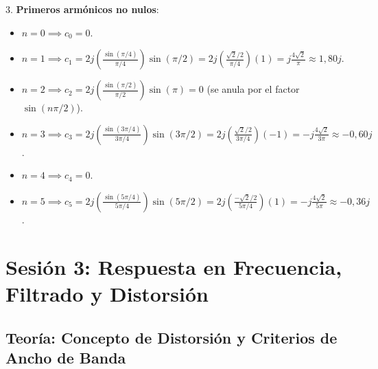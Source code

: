 \begin{resolucion}
3. \textbf{Primeros armónicos no nulos}:
   \begin{itemize}
       \item $n = 0 \implies c_0 = 0$.
       \item $n = 1 \implies c_1 = 2j \left(\frac{\sin(\pi/4)}{\pi/4}\right) \sin(\pi/2) = 2j \left(\frac{\sqrt{2}/2}{\pi/4}\right) (1) = j \frac{4\sqrt{2}}{\pi} \approx 1{,}80j$.
       \item $n = 2 \implies c_2 = 2j \left(\frac{\sin(\pi/2)}{\pi/2}\right) \sin(\pi) = 0$ (se anula por el factor $\sin(n\pi/2)$).
       \item $n = 3 \implies c_3 = 2j \left(\frac{\sin(3\pi/4)}{3\pi/4}\right) \sin(3\pi/2) = 2j \left(\frac{\sqrt{2}/2}{3\pi/4}\right) (-1) = -j \frac{4\sqrt{2}}{3\pi} \approx -0{,}60j$.
       \item $n = 4 \implies c_4 = 0$.
       \item $n = 5 \implies c_5 = 2j \left(\frac{\sin(5\pi/4)}{5\pi/4}\right) \sin(5\pi/2) = 2j \left(\frac{-\sqrt{2}/2}{5\pi/4}\right) (1) = -j \frac{4\sqrt{2}}{5\pi} \approx -0{,}36j$.
   \end{itemize}
\end{resolucion}

\newpage

\section{Sesión 3: Respuesta en Frecuencia, Filtrado y Distorsión}

\subsection{Teoría: Concepto de Distorsión y Criterios de Ancho de Banda}

